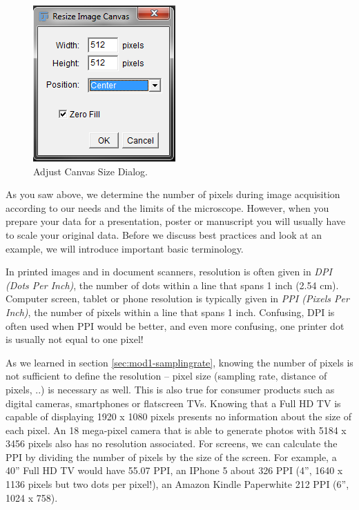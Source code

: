 \begin{figure}[!ht]
	\captionsetup{justification=centering}
	\centering
		\includegraphics{mod1/figures/adjust-canvas-dialog.png}
		\caption{Adjust Canvas Size Dialog.}\label{fig:adjust-canvas-dialog}
\end{figure}

As you saw above, we determine the number of pixels during image acquisition according to our needs and the limits of the microscope. However, when you prepare your data for a presentation, poster or manuscript you will usually have to scale your original data. Before we discuss best practices and look at an example, we will introduce important basic terminology.


In printed images and in document scanners, resolution is often given in \emph{DPI (Dots Per Inch)}, the number of dots within a line that spans 1 inch (2.54 cm). Computer screen, tablet or phone resolution is typically given in \emph{PPI (Pixels Per Inch)}, the number of pixels within a line that spans 1 inch. Confusing, DPI is often used when PPI would be better, and even more confusing, one printer dot is usually not equal to one pixel! 

As we learned in section \ref{sec:mod1-samplingrate}, knowing the number of pixels is not sufficient to define the resolution -- pixel size (sampling rate, distance of pixels, ..) is necessary as well. This is also true for consumer products such as digital cameras, smartphones or flatscreen TVs. Knowing that a Full HD TV is capable of displaying 1920 x 1080 pixels presents no information about the size of each pixel. An 18 mega-pixel camera that is able to generate photos with 5184 x 3456 pixels also has no resolution associated. For screens, we can calculate the PPI by dividing the number of pixels by the size of the screen. For example, a 40'' Full HD TV would have 55.07 PPI, an IPhone 5 about 326 PPI (4'', 1640 x 1136 pixels but two dots per pixel!), an Amazon Kindle Paperwhite 212 PPI (6'', 1024 x 758). 

